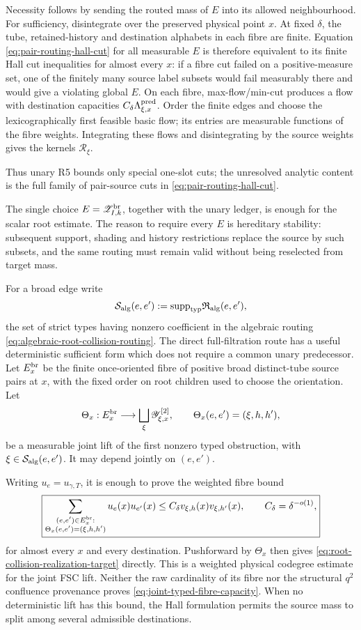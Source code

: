 \documentclass[11pt]{article}
\newcommand{\supp}{\mathrm{supp}}
\begin{document}
Necessity follows by sending the routed mass of \(E\) into its allowed
neighbourhood.  For sufficiency, disintegrate over the preserved physical
point \(x\).  At fixed \(\delta\), the tube, retained-history and destination
alphabets in each fibre are finite.  Equation
\eqref{eq:pair-routing-hall-cut} for all measurable \(E\) is therefore
equivalent to its finite Hall cut inequalities for almost every \(x\): if a
fibre cut failed on a positive-measure set, one of the finitely many source
label subsets would fail measurably there and would give a violating global
\(E\).  On each fibre, max-flow/min-cut produces a flow with destination
capacities \(C_\delta\Lambda_{\xi,x}^{\rm pred}\).  Order the finite edges and
choose the lexicographically first feasible basic flow; its entries are
measurable functions of the fibre weights.  Integrating these flows and
disintegrating by the source weights gives the kernels \(\mathcal R_\xi\).

Thus unary R5 bounds only special one-slot cuts; the
unresolved analytic content is the full family of pair-source cuts in
\eqref{eq:pair-routing-hall-cut}.

The single choice \(E=\mathscr Z^{\rm br}_{I,k}\), together with the unary
ledger, is enough for the scalar root estimate.  The reason to require every
\(E\) is hereditary stability: subsequent support, shading and history
restrictions replace the source by such subsets, and the same routing must
remain valid without being reselected from target mass.


For a broad edge write
\[
 \mathcal S_{\rm alg}(e,e')
 :=\supp_{\rm typ}\mathfrak R_{\rm alg}(e,e'),
\]
the set of strict types having nonzero coefficient in the algebraic routing
\eqref{eq:algebraic-root-collision-routing}.  The direct full-filtration route
has a useful deterministic sufficient form which does not require a common
unary predecessor.  Let \(E_x^{\rm br}\) be the finite once-oriented fibre of
positive broad distinct-tube source pairs at \(x\), with the fixed order on
root children used to choose the orientation.  Let
\[
 \Theta_x:E_x^{\rm br}\longrightarrow
 \bigsqcup_\xi\mathscr Y_{\xi,x}^{[2]},
 \qquad
 \Theta_x(e,e')=(\xi,h,h'),
\]
be a measurable joint lift of the first nonzero typed obstruction, with
\(\xi\in\mathcal S_{\rm alg}(e,e')\).  It may depend jointly on \((e,e')\).

Writing \(u_e=u_{\gamma,T}\), it is enough to prove the weighted fibre bound
\begin{equation}\label{eq:joint-typed-fibre-capacity}
 \boxed{
 \sum_{\substack{(e,e')\in E_x^{\rm br}:\\
       \Theta_x(e,e')=(\xi,h,h')}}
 u_e(x)u_{e'}(x)
 \le C_\delta v_{\xi,h}(x)v_{\xi,h'}(x),
 \qquad C_\delta=\delta^{-o(1)},}
\end{equation}
for almost every \(x\) and every destination.  Pushforward by \(\Theta_x\)
then gives \eqref{eq:root-collision-realization-target} directly.  This is a
weighted physical codegree estimate for the joint FSC lift.  Neither the raw
cardinality of its fibre nor the structural \(q^2\) confluence provenance
proves \eqref{eq:joint-typed-fibre-capacity}.  When no deterministic lift has
this bound, the Hall formulation permits the source mass to split among
several admissible destinations.
\end{document}
